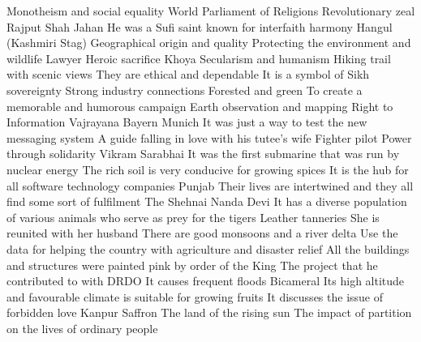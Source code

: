 \answerkey
{} Monotheism and social equality
 World Parliament of Religions
 Revolutionary zeal
 Rajput
 Shah Jahan
 He was a Sufi saint known for interfaith harmony
 Hangul (Kashmiri Stag)
 Geographical origin and quality
 Protecting the environment and wildlife
 Lawyer
 Heroic sacrifice
 Khoya
 Secularism and humanism
 Hiking trail with scenic views
 They are ethical and dependable
 It is a symbol of Sikh sovereignty
 Strong industry connections
 Forested and green
 To create a memorable and humorous campaign
 Earth observation and mapping
 Right to Information
 Vajrayana
 Bayern Munich
 It was just a way to test the new messaging system
 A guide falling in love with his tutee's wife
 Fighter pilot
 Power through solidarity
 Vikram Sarabhai
 It was the first submarine that was run by nuclear energy
 The rich soil is very conducive for growing spices
 It is the hub for all software technology companies
 Punjab
 Their lives are intertwined and they all find some sort of fulfilment
 The Shehnai
 Nanda Devi
 It has a diverse population of various animals who serve as prey for the tigers
 Leather tanneries
 She is reunited with her husband
 There are good monsoons and a river delta
 Use the data for helping the country with agriculture and disaster relief
 All the buildings and structures were painted pink by order of the King
 The project that he contributed to with DRDO
 It causes frequent floods
 Bicameral
 Its high altitude and favourable climate is suitable for growing fruits
 It discusses the issue of forbidden love
 Kanpur
 Saffron
 The land of the rising sun
 The impact of partition on the lives of ordinary people
\endanswerkey